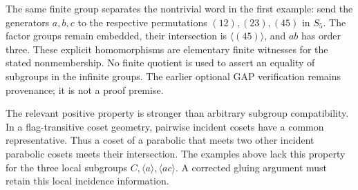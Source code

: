 The same finite group separates the nontrivial word in the first example:
send the generators $a,b,c$ to the respective permutations $(12),(23),(45)$ in $S_5$. The factor groups remain
embedded, their intersection is $\langle(45)\rangle$, and $ab$ has order
three. These explicit homomorphisms are elementary finite witnesses for the stated nonmembership. No finite quotient is used to assert an equality of subgroups in the infinite groups. The earlier optional GAP verification remains provenance; it is not a proof premise.

The relevant positive property is stronger than arbitrary subgroup
compatibility. In a flag-transitive coset geometry, pairwise incident
cosets have a common representative. Thus a coset of a parabolic that
meets two other incident parabolic cosets meets their intersection.
The examples above lack this property for the three local subgroups
$C,\langle a\rangle,\langle ac\rangle$. A corrected gluing argument
must retain this local incidence information.
